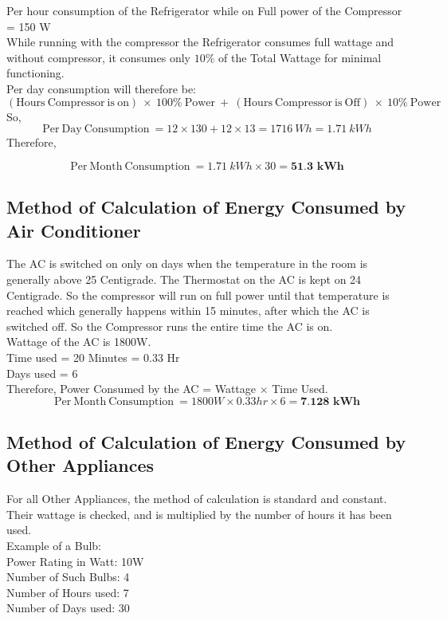 \documentclass[11pt,a4paper]{article}
\begin{document}
Per hour consumption of the Refrigerator while on Full power of the Compressor = 150 W\\

\noindent
While running with the compressor the Refrigerator consumes full wattage and without compressor, it consumes only $ 10 \% $ of the Total Wattage for minimal functioning.\\ 

Per day consumption will therefore be:
$$
\mathrm{(Hours\ Compressor\ is\ on)}\ \times\ 100\% \ \mathrm{Power}\ +\ \mathrm{(Hours\ Compressor\ is\ Off)}\ \times\ 10\%\ \mathrm{Power}
$$
\noindent
So, 
$$
\mathrm{Per\ Day\ Consumption\ } = 12 \times 130 + 12 \times 13 = 1716\ Wh = 1.71\ kWh
$$
\noindent
Therefore, 

$$
\mathrm{Per\ Month\ Consumption\ } = 1.71\ kWh \times 30 = \textbf{51.3\ kWh}
$$


\subsection{Method of Calculation of Energy Consumed by Air Conditioner}
The AC is switched on only on days when the temperature in the room is generally above 25 \degree Centigrade. The Thermostat on the AC is kept on 24 \degree Centigrade. So the compressor will run on full power until that temperature is reached which generally happens within 15 minutes, after which the AC is switched off. So the Compressor runs the entire time the AC is on. \\
\noindent
Wattage of the AC is 1800W. \\
Time used = 20 Minutes = 0.33 Hr\\
Days used = 6\\
Therefore, 
Power Consumed by the AC = Wattage $\times$ Time Used. 
$$
\mathrm{Per\ Month\ Consumption\ } = 1800W \times 0.33hr \times 6 = \textbf{7.128\ kWh}
$$
\subsection{Method of Calculation of Energy Consumed by Other Appliances}

For all Other Appliances, the method of calculation is standard and constant. Their wattage is checked, and is multiplied by the number of hours it has been used. \\

\noindent
Example of a Bulb:\\

\noindent
Power Rating in Watt: 10W\\
Number of Such Bulbs: 4\\
Number of Hours used: 7\\
Number of Days used: 30\\
\end{document}
